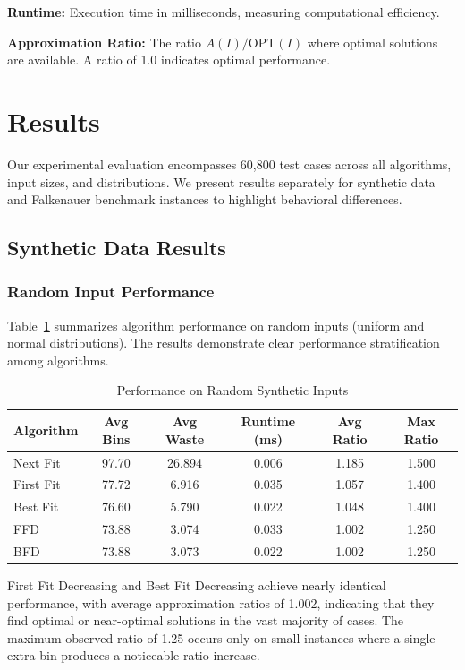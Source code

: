 \documentclass[11pt,a4paper]{article}
\begin{document}
\textbf{Runtime:} Execution time in milliseconds, measuring computational efficiency.

\textbf{Approximation Ratio:} The ratio $A(I)/\text{OPT}(I)$ where optimal solutions are available. A ratio of 1.0 indicates optimal performance.

\section{Results}

Our experimental evaluation encompasses 60,800 test cases across all algorithms, input sizes, and distributions. We present results separately for synthetic data and Falkenauer benchmark instances to highlight behavioral differences.

\subsection{Synthetic Data Results}

\subsubsection{Random Input Performance}

Table~\ref{tab:random_results} summarizes algorithm performance on random inputs (uniform and normal distributions). The results demonstrate clear performance stratification among algorithms.

\begin{table}[htbp]
\centering
\caption{Performance on Random Synthetic Inputs}
\label{tab:random_results}
\begin{tabular}{lccccc}
\toprule
\textbf{Algorithm} & \textbf{Avg Bins} & \textbf{Avg Waste} & \textbf{Runtime (ms)} & \textbf{Avg Ratio} & \textbf{Max Ratio} \\
\midrule
Next Fit & 97.70 & 26.894 & 0.006 & 1.185 & 1.500 \\
First Fit & 77.72 & 6.916 & 0.035 & 1.057 & 1.400 \\
Best Fit & 76.60 & 5.790 & 0.022 & 1.048 & 1.400 \\
FFD & 73.88 & 3.074 & 0.033 & 1.002 & 1.250 \\
BFD & 73.88 & 3.073 & 0.022 & 1.002 & 1.250 \\
\bottomrule
\end{tabular}
\end{table}

First Fit Decreasing and Best Fit Decreasing achieve nearly identical performance, with average approximation ratios of 1.002, indicating that they find optimal or near-optimal solutions in the vast majority of cases. The maximum observed ratio of 1.25 occurs only on small instances where a single extra bin produces a noticeable ratio increase.
\end{document}
